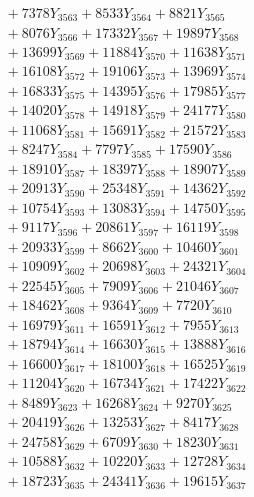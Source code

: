 \documentclass[a4paper,10pt]{article}
\begin{document}
{\begin{align}
&\;  + 7378 Y_{3563} + 8533 Y_{3564} + 8821 Y_{3565} \\[0.3ex]
&\;  + 8076 Y_{3566} + 17332 Y_{3567} + 19897 Y_{3568} \\[0.5ex]\allowbreak
&\;  + 13699 Y_{3569} + 11884 Y_{3570} + 11638 Y_{3571} \\[0.3ex]
&\;  + 16108 Y_{3572} + 19106 Y_{3573} + 13969 Y_{3574} \\[0.3ex]
&\;  + 16833 Y_{3575} + 14395 Y_{3576} + 17985 Y_{3577} \\[0.3ex]
&\;  + 14020 Y_{3578} + 14918 Y_{3579} + 24177 Y_{3580} \\[0.3ex]
&\;  + 11068 Y_{3581} + 15691 Y_{3582} + 21572 Y_{3583} \\[0.3ex]
&\;  + 8247 Y_{3584} + 7797 Y_{3585} + 17590 Y_{3586} \\[0.3ex]
&\;  + 18910 Y_{3587} + 18397 Y_{3588} + 18907 Y_{3589} \\[0.3ex]
&\;  + 20913 Y_{3590} + 25348 Y_{3591} + 14362 Y_{3592} \\[0.3ex]
&\;  + 10754 Y_{3593} + 13083 Y_{3594} + 14750 Y_{3595} \\[0.3ex]
&\;  + 9117 Y_{3596} + 20861 Y_{3597} + 16119 Y_{3598} \\[0.5ex]\allowbreak
&\;  + 20933 Y_{3599} + 8662 Y_{3600} + 10460 Y_{3601} \\[0.3ex]
&\;  + 10909 Y_{3602} + 20698 Y_{3603} + 24321 Y_{3604} \\[0.3ex]
&\;  + 22545 Y_{3605} + 7909 Y_{3606} + 21046 Y_{3607} \\[0.3ex]
&\;  + 18462 Y_{3608} + 9364 Y_{3609} + 7720 Y_{3610} \\[0.3ex]
&\;  + 16979 Y_{3611} + 16591 Y_{3612} + 7955 Y_{3613} \\[0.3ex]
&\;  + 18794 Y_{3614} + 16630 Y_{3615} + 13888 Y_{3616} \\[0.3ex]
&\;  + 16600 Y_{3617} + 18100 Y_{3618} + 16525 Y_{3619} \\[0.3ex]
&\;  + 11204 Y_{3620} + 16734 Y_{3621} + 17422 Y_{3622} \\[0.3ex]
&\;  + 8489 Y_{3623} + 16268 Y_{3624} + 9270 Y_{3625} \\[0.3ex]
&\;  + 20419 Y_{3626} + 13253 Y_{3627} + 8417 Y_{3628} \\[0.5ex]\allowbreak
&\;  + 24758 Y_{3629} + 6709 Y_{3630} + 18230 Y_{3631} \\[0.3ex]
&\;  + 10588 Y_{3632} + 10220 Y_{3633} + 12728 Y_{3634} \\[0.3ex]
&\;  + 18723 Y_{3635} + 24341 Y_{3636} + 19615 Y_{3637} \\[0.3ex]

\end{align}}
\end{document}

